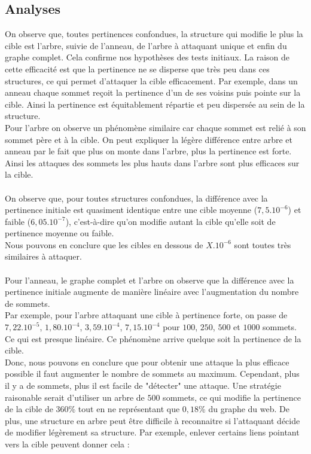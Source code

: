 \documentclass[a4paper,11pt]{article}
\begin{document}
	\subsection{Analyses}
		On observe que, toutes pertinences confondues, la structure qui modifie le plus la cible est l'arbre, suivie de l'anneau, de l'arbre à attaquant unique et enfin du graphe complet. Cela confirme nos hypothèses des tests initiaux. La raison de cette efficacité est que la pertinence ne se disperse que très peu dans ces structures, ce qui permet d'attaquer la cible efficacement. Par exemple, dans un anneau chaque sommet reçoit la pertinence d'un de ses voisins puis pointe sur la cible. Ainsi la pertinence est équitablement répartie et peu dispersée au sein de la structure.\\
		Pour l'arbre on observe un phénomène similaire car chaque sommet est relié à son sommet père et à la cible. On peut expliquer la légère différence entre arbre et anneau par le fait que plus on monte dans l'arbre, plus la pertinence est forte. Ainsi les attaques des sommets les plus hauts dans l'arbre sont plus efficaces sur la cible.\\
		\\
		On observe que, pour toutes structures confondues, la différence avec la pertinence initiale est quasiment identique entre une cible moyenne ($7,5.10^{-6}$) et faible ($6,05.10^{-7}$), c'est-à-dire qu'on modifie autant la cible qu'elle soit de pertinence moyenne ou faible.\\
		Nous pouvons en conclure que les cibles en dessous de $X.10^{-6}$ sont toutes très similaires à attaquer.\\
		\\
		Pour l'anneau, le graphe complet et l'arbre on observe que la différence avec la pertinence initiale augmente de manière linéaire avec l'augmentation du nombre de sommets.\\
		Par exemple, pour l'arbre attaquant une cible à pertinence forte, on passe de $7,22.10^{-5}$, $1,80.10^{-4}$, $3,59.10^{-4}$, $7,15.10^{-4}$ pour $100$, $250$, $500$ et $1000$ sommets. Ce qui est presque linéaire. Ce phénomène arrive quelque soit la pertinence de la cible.\\
		Donc, nous pouvons en conclure que pour obtenir une attaque la plus efficace possible il faut augmenter le nombre de sommets au maximum. Cependant, plus il y a de sommets, plus il est facile de "détecter" une attaque. Une stratégie raisonable serait d'utiliser un arbre de $500$ sommets, ce qui modifie la pertinence de la cible de $360$\% tout en ne représentant que $0,18$\% du graphe du web. De plus, une structure en arbre peut être difficile à reconnaitre si l'attaquant décide de modifier légèrement sa structure. Par exemple, enlever certains liens pointant vers la cible peuvent donner cela : \\
\end{document}
